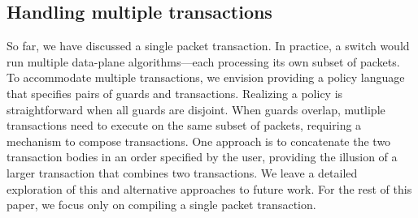 \subsection{Handling multiple transactions}
\label{ss:multiple}
So far, we have discussed a single packet transaction. In practice, a switch
would run multiple data-plane algorithms---each processing its own subset of
packets. To accommodate multiple transactions, we envision providing a policy
language that specifies pairs of guards and transactions. Realizing a policy is
straightforward when all guards are disjoint. When guards overlap, mutliple
transactions need to execute on the same subset of packets, requiring a
mechanism to compose transactions. One approach is to concatenate the two
transaction bodies in an order specified by the user, providing the illusion of
a larger transaction that combines two transactions. We leave a detailed
exploration of this and alternative approaches to future work. For the rest of
this paper, we focus only on compiling a single packet transaction.
